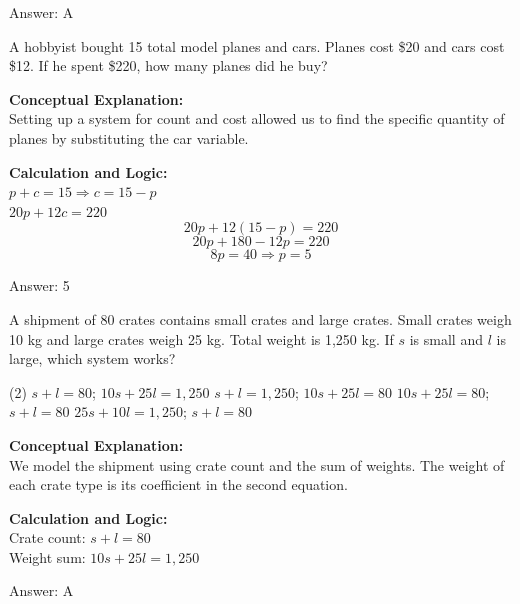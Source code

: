 \documentclass[11pt,paper=a4,answers]{exam}
\begin{document}
\begin{questions}
\begin{solution}
\vspace{15pt}
Answer: \colorbox{yellow!100}{A}
\end{solution}

\question
A hobbyist bought 15 total model planes and cars. Planes cost \$20 and cars cost \$12. If he spent \$220, how many planes did he buy?

\begin{solution}
\textbf{Conceptual Explanation:} \\
Setting up a system for count and cost allowed us to find the specific quantity of planes by substituting the car variable.

\vspace{10pt}
\textbf{Calculation and Logic:} \\
$p + c = 15 \Rightarrow c = 15 - p$ \\
$20p + 12c = 220$ \\
\[20p + 12(15 - p) = 220\]
\[20p + 180 - 12p = 220\]
\[8p = 40 \Rightarrow p = 5\]

\vspace{15pt}
Answer: \colorbox{yellow!100}{5}
\end{solution}

\question
A shipment of 80 crates contains small crates and large crates. Small crates weigh 10 kg and large crates weigh 25 kg. Total weight is 1,250 kg. If $s$ is small and $l$ is large, which system works?
\begin{tasks}(2)
    \task $s + l = 80$; $10s + 25l = 1,250$
    \task $s + l = 1,250$; $10s + 25l = 80$
    \task $10s + 25l = 80$; $s + l = 80$
    \task $25s + 10l = 1,250$; $s + l = 80$
\end{tasks}

\begin{solution}
\textbf{Conceptual Explanation:} \\
We model the shipment using crate count and the sum of weights. The weight of each crate type is its coefficient in the second equation.

\vspace{10pt}
\textbf{Calculation and Logic:} \\
Crate count: $s + l = 80$ \\
Weight sum: $10s + 25l = 1,250$

\vspace{15pt}
Answer: \colorbox{yellow!100}{A}
\end{solution}


\end{questions}
\end{document}
